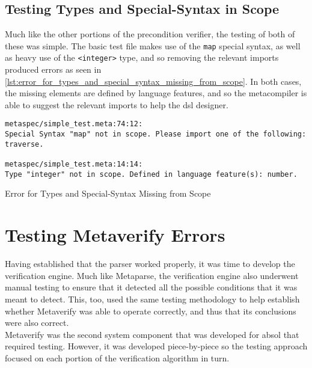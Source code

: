 \subsection{Testing Types and Special-Syntax in Scope} %
\label{sub:testing_types_and_special_syntax_in_scope}
Much like the other portions of the precondition verifier, the testing of both of these was simple. 
The basic test file makes use of the \texttt{map} special syntax, as well as heavy use of the \texttt{<integer>} type, and so removing the relevant imports produced errors as seen in \autoref{lst:error_for_types_and_special_syntax_missing_from_scope}.
In both cases, the missing elements are defined by language features, and so the metacompiler is able to suggest the relevant imports to help the \gls{dsl} designer. 

\begin{listing}[!htb]
\begin{verbatim}
metaspec/simple_test.meta:74:12:
Special Syntax "map" not in scope. Please import one of the following: traverse.

metaspec/simple_test.meta:14:14:
Type "integer" not in scope. Defined in language feature(s): number.
\end{verbatim}
\caption{Error for Types and Special-Syntax Missing from Scope}
\label{lst:error_for_types_and_special_syntax_missing_from_scope}
\end{listing}




\section{Testing Metaverify Errors} %
\label{sec:testing_metaverify_errors}
Having established that the parser worked properly, it was time to develop the verification engine. 
Much like Metaparse, the verification engine also underwent manual testing to ensure that it detected all the possible conditions that it was meant to detect. 
This, too, used the same testing methodology to help establish whether Metaverify was able to operate correctly, and thus that its conclusions were also correct.\\

Metaverify was the second system component that was developed for \gls{absol} that required testing.
However, it was developed piece-by-piece so the testing approach focused on each portion of the verification algorithm in turn. 

